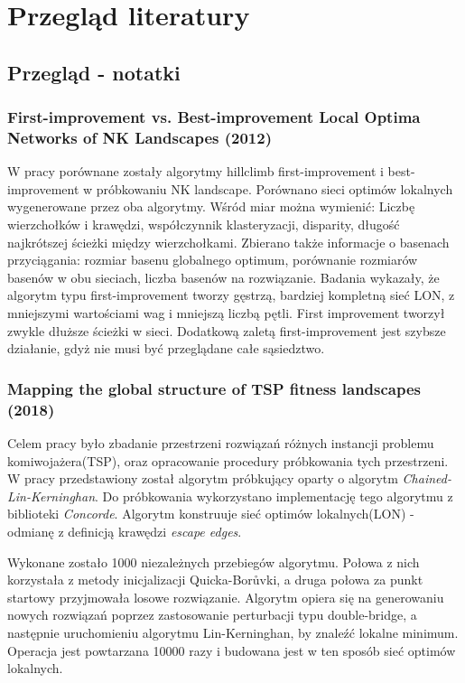 \chapter{Przegląd literatury}
\section{Przegląd - notatki}

\subsection*{First-improvement vs. Best-improvement Local Optima Networks of NK Landscapes (2012)\cite{DBLP:journals/corr/abs-1207-4455}}
W pracy porównane zostały algorytmy hillclimb first-improvement i best-improvement w próbkowaniu
NK landscape. Porównano sieci optimów lokalnych wygenerowane przez oba algorytmy.
Wśród miar można wymienić: Liczbę wierzchołków i krawędzi, współczynnik klasteryzacji,
disparity, długość najkrótszej ścieżki między wierzchołkami.
Zbierano także informacje o basenach przyciągania: rozmiar basenu globalnego optimum,
porównanie rozmiarów basenów w obu sieciach, liczba basenów na rozwiązanie.
Badania wykazały, że algorytm typu first-improvement tworzy gęstrzą, bardziej kompletną sieć LON,
z mniejszymi wartościami wag i mniejszą liczbą pętli. First improvement tworzył zwykle dłuższe ścieżki
w sieci. Dodatkową zaletą first-improvement jest szybsze działanie, gdyż nie musi być przeglądane całe sąsiedztwo.

\subsection*{Mapping the global structure of TSP fitness landscapes (2018) \cite{DBLP:journals/heuristics/OchoaV18}}
Celem pracy było zbadanie przestrzeni rozwiązań różnych instancji problemu komiwojażera(TSP), oraz opracowanie
procedury próbkowania tych przestrzeni.
W pracy przedstawiony został algorytm próbkujący oparty o algorytm \textit{Chained-Lin-Kerninghan}.
Do próbkowania wykorzystano implementację tego algorytmu z biblioteki \textit{Concorde}.
Algorytm konstruuje sieć optimów lokalnych(LON) - odmianę z definicją krawędzi \textit{escape edges}.

Wykonane zostało 1000 niezależnych przebiegów algorytmu.
Połowa z nich korzystała z metody inicjalizacji Quicka-Borůvki, a druga połowa za punkt startowy przyjmowała losowe rozwiązanie.
Algorytm opiera się na generowaniu nowych rozwiązań poprzez zastosowanie perturbacji typu double-bridge,
a następnie uruchomieniu algorytmu Lin-Kerninghan, by znaleźć lokalne minimum.
Operacja jest powtarzana 10000 razy i budowana jest w ten sposób sieć optimów lokalnych.

